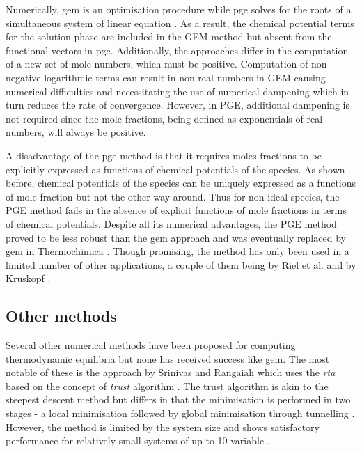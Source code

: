 	Numerically, \gls{gem} is an optimisation procedure while \gls{pge} solves for the roots of a simultaneous system of linear equation \cite{vanZeggeren11}. As a result, the chemical potential terms for the solution phase are included in the GEM method but absent from the functional vectors in \gls{pge}. Additionally, the approaches differ in the computation of a new set of mole numbers, which must be positive. Computation of non-negative logarithmic terms can result in non-real numbers in GEM causing numerical difficulties and necessitating the use of numerical dampening which in turn reduces the rate of convergence. However, in PGE, additional dampening is not required since the mole fractions, being defined as exponentials of real numbers, will always be positive.

	A disadvantage of the \gls{pge} method is that it requires moles fractions to be explicitly expressed as functions of chemical potentials of the species. As shown before, chemical potentials of the species can be uniquely expressed as a functions of mole fraction but not the other way around. Thus for non-ideal species, the PGE method fails in the absence of explicit functions of mole fractions in terms of chemical potentials. Despite all its numerical advantages, the PGE method proved to be less robust than the \gls{gem} approach and was eventually replaced by \gls{gem} in Thermochimica \cite{Bajpai:2021ab}. Though promising, the method has only been used in a limited number of other applications, a couple of them being by Riel et al. \cite{Riel:2022aa} and by Kruskopf \cite{Kruskopf:2018aa}.

	\subsection{Other methods}
	Several other numerical methods have been proposed for computing thermodynamic equilibria but none has received success like \gls{gem}. The most notable of these is the approach by Srinivas and Rangaiah which uses  the \emph{\gls{rta}} based on the concept of \emph{\gls{trust}} algorithm \cite{Srinivas06}. The \gls{trust} algorithm is akin to the steepest descent method but differs in that the minimisation is performed in two stages - a local minimisation followed by global minimisation through tunnelling \cite{Nocedal06}.  However, the method is limited by the system size and shows satisfactory performance for relatively small systems of up to 10 variable \cite{Nocedal06}.

